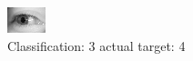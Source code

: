 \begin{figure}[h!]
\begin{center}
\includegraphics[width=0.60\columnwidth]{figures/ID3116_class_3_target_4.png}
\end{center}
\caption{ Classification: 3 actual target: 4}
\label{fig:ID3116_class_3_target_4}
\end{figure}
